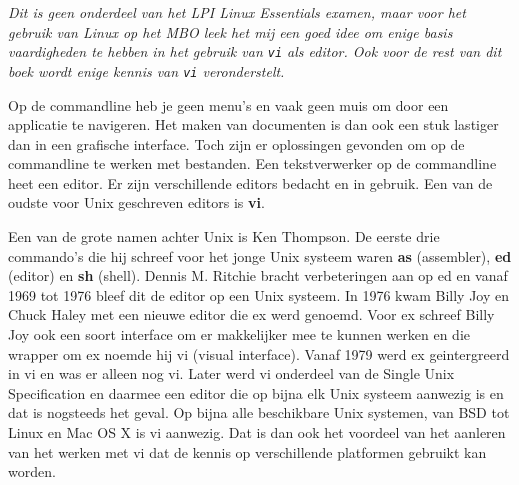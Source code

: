 \textsl{Dit is geen onderdeel van het LPI Linux Essentials examen, maar voor het gebruik van Linux op het MBO leek het mij een goed idee om enige basis vaardigheden te hebben in het gebruik van \texttt{vi} als editor. Ook voor de rest van dit boek wordt enige kennis van \texttt{vi} veronderstelt.}

Op de commandline heb je geen menu's en vaak geen muis om door een applicatie te navigeren. Het maken van documenten is dan ook een stuk lastiger dan in een grafische interface. Toch zijn er oplossingen gevonden om op de commandline te werken met bestanden. Een tekstverwerker op de commandline heet een editor. Er zijn verschillende editors bedacht en in gebruik. Een van de oudste voor Unix geschreven editors is \textbf{vi}.

Een van de grote namen achter Unix is Ken Thompson. De eerste drie commando's die hij schreef voor het jonge Unix systeem waren \textbf{as} (assembler), \textbf{ed} (editor) en \textbf{sh} (shell). Dennis M. Ritchie bracht verbeteringen aan op ed en vanaf 1969 tot 1976 bleef dit de editor op een Unix systeem. In 1976 kwam Billy Joy en Chuck Haley met een nieuwe editor die ex werd genoemd. Voor ex schreef Billy Joy ook een soort interface om er makkelijker mee te kunnen werken en die wrapper om ex noemde hij vi (visual interface). Vanaf 1979 werd ex geintergreerd in vi en was er alleen nog vi. Later werd vi onderdeel van de Single Unix Specification en daarmee een editor die op bijna elk Unix systeem aanwezig is en dat is nogsteeds het geval. Op bijna alle beschikbare Unix systemen, van BSD tot Linux en Mac OS X is vi aanwezig. Dat is dan ook het voordeel van het aanleren van het werken met vi dat de kennis op verschillende platformen gebruikt kan worden.
